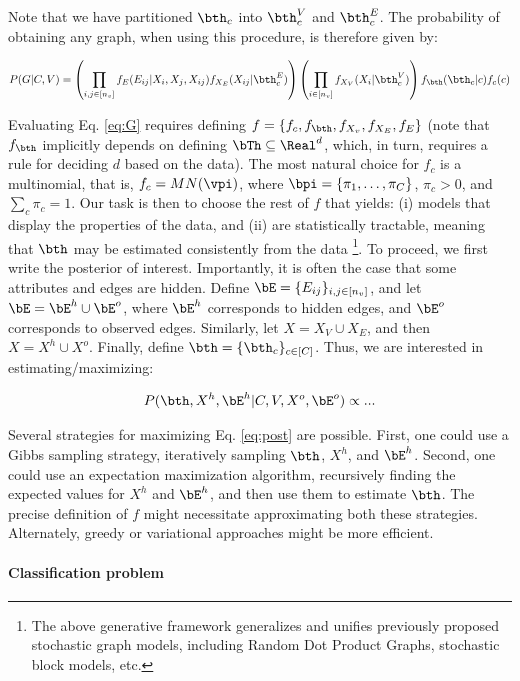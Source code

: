 Note that we have partitioned $\bth_c$ into $\bth_c^V$ and $\bth_c^E$.  The probability of obtaining any graph, when using this procedure, is therefore given by:

\begin{align} \label{eq:G}
	P(G | C,V) = \left(\prod_{i,j \in [n_v]} f_E(E_{ij} | X_i, X_j, X_{ij}) f_{X_E}(X_{ij} | \bth_c^E) \right) \left(\prod_{i \in [n_v]} f_{X_V}(X_i | \bth_c^V) \right) f_{\bth}(\bth_c | c)  f_c(c)
\end{align}

Evaluating Eq. \ref{eq:G} requires defining $f=\{f_c, f_{\bth}, f_{X_v}, f_{X_E}, f_E\}$ (note that $f_{\bth}$ implicitly depends on defining $\bTh \subseteq \Real^d$, which, in turn, requires a rule for deciding $d$ based on the data).  The most natural choice for $f_c$ is a multinomial, that is, $f_c = MN(\vpi)$, where $\bpi = \{\pi_1, \ldots, \pi_C\}$, $\pi_c>0$, and $\sum_c \pi_c = 1$.   Our task is then to choose the rest of $f$ that yields: (i) models that display the properties of the data, and (ii) are statistically tractable, meaning that $\bth$ may be estimated consistently from the data \footnote{The above generative framework generalizes and unifies previously proposed stochastic graph models, including Random Dot Product Graphs, stochastic block models, etc.}.  To proceed, we first write the posterior of interest.  Importantly, it is often the case that some attributes and edges are hidden.  Define $\bE=\{E_{ij}\}_{i,j \in [n_v]}$, and let $\bE = \bE^h \cup \bE^o$, where $\bE^h$ corresponds to hidden edges, and $\bE^o$ corresponds to observed edges.  Similarly,  let $X = X_V \cup X_E$, and then $X= X^h \cup X^o$. Finally, define $\bth=\{\bth_c\}_{c \in [C]}$. Thus, we are interested in estimating/maximizing:


\begin{align} \label{eq:post}
	P(\bth, X^h, \bE^h | C, V, X^o, \bE^o) \propto ...
\end{align}


Several strategies for maximizing Eq. \ref{eq:post} are possible.  First, one could use a Gibbs sampling strategy, iteratively sampling $\bth$, $X^h$, and $\bE^h$.  Second, one could use an expectation maximization algorithm, recursively finding the expected values for $X^h$ and $\bE^h$, and then use them to estimate $\bth$.  The precise definition of $f$ might necessitate approximating both these strategies.  Alternately, greedy or variational approaches might be more efficient.


\paragraph{Classification problem}


